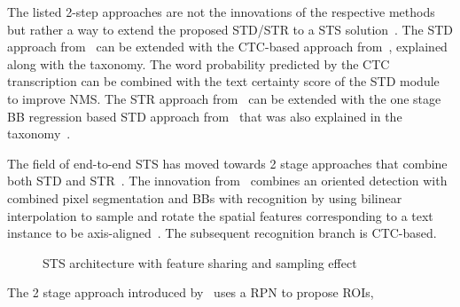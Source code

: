 The listed 2-step approaches are not the innovations of the respective methods but rather a
way to extend the proposed \ac{STD}/\ac{STR} to a \ac{STS}
solution~\citep{liao_textboxes_2018,shi_aster_2019}.
The \ac{STD} approach from~\cite{liao_textboxes_2018} can be extended with the \ac{CTC}-based
approach from~\cite{shi_end--end_2017}, explained along with the taxonomy.
The word probability predicted by the \ac{CTC} transcription can be combined with the
text certainty score of the \ac{STD} module to improve \ac{NMS}.
The \ac{STR} approach from~\cite{shi_aster_2019} can be extended with the one stage
\ac{BB} regression based \ac{STD} approach from~\cite{liao_textboxes_2017} that was also explained
in the taxonomy~\citep{shi_aster_2019}.

The field of end-to-end \ac{STS} has moved towards 2 stage approaches that combine both \ac{STD}
and \ac{STR}~\citep{lyu_mask_2018,long_scene_2021}.
The innovation from~\cite{liu_fots_2018} combines an oriented detection with combined pixel
segmentation and \acp{BB} with recognition by using bilinear interpolation to sample and rotate
the spatial features corresponding to a text instance to be axis-aligned~\citep{liu_fots_2018}.
The subsequent recognition branch is \ac{CTC}-based.
\begin{figure}[hb]
    \centering
    \caption[STS architecture with feature sharing]{%
        STS architecture with feature sharing and sampling
        effect~\citep{liu_fots_2018}\label{fig:2-stage-example-LIU-Fots-2018}
    }
\end{figure}
The 2 stage approach introduced by~\cite{lyu_mask_2018} uses a \ac{RPN} to propose \acp{ROI},
